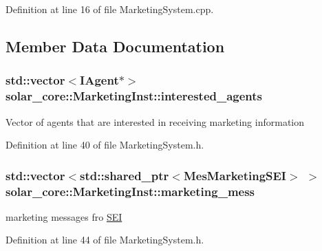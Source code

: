 Definition at line 16 of file Marketing\+System.\+cpp.



\subsection{Member Data Documentation}
\hypertarget{classsolar__core_1_1_marketing_inst_a5e0f3d40db44d0779a944ecdad24d447}{}
\subsubsection[{interested\+\_\+agents}]{\setlength{\rightskip}{0pt plus 5cm}std\+::vector$<${\bf I\+Agent}$\ast$$>$ solar\+\_\+core\+::\+Marketing\+Inst\+::interested\+\_\+agents\hspace{0.3cm}{\ttfamily [protected]}}\label{classsolar__core_1_1_marketing_inst_a5e0f3d40db44d0779a944ecdad24d447}
Vector of agents that are interested in receiving marketing information 

Definition at line 40 of file Marketing\+System.\+h.

\hypertarget{classsolar__core_1_1_marketing_inst_af386df7399502fc26c6625600a68edb3}{}
\subsubsection[{marketing\+\_\+mess}]{\setlength{\rightskip}{0pt plus 5cm}std\+::vector$<$std\+::shared\+\_\+ptr$<${\bf Mes\+Marketing\+S\+E\+I}$>$ $>$ solar\+\_\+core\+::\+Marketing\+Inst\+::marketing\+\_\+mess\hspace{0.3cm}{\ttfamily [protected]}}\label{classsolar__core_1_1_marketing_inst_af386df7399502fc26c6625600a68edb3}
marketing messages fro \hyperlink{classsolar__core_1_1_s_e_i}{S\+E\+I} 

Definition at line 44 of file Marketing\+System.\+h.

\hypertarget{classsolar__core_1_1_marketing_inst_a58a4f5acc2492edebfde65bee94802b9}{}
